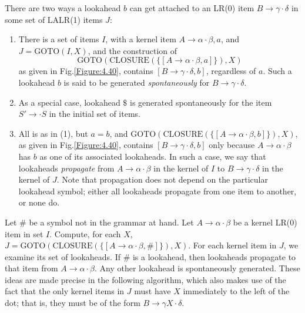 \documentclass[12pt,a4paper,twoside,openany]{book}
\begin{document}
There are two ways a lookahead $b$ can get attached to an LR(0) item $B\rightarrow\gamma\cdot\delta$ in some set of LALR(1) items $J$:
\begin{enumerate}
    \item There is a set of items $I$, with a kernel item $A\rightarrow\alpha\cdot\beta,a$, and $J=\mathrm{GOTO}(I,X)$, and the construction of $$\text{GOTO}(\text{CLOSURE}(\{[A\rightarrow\alpha\cdot\beta,a]\}),X)$$ as given in Fig.\;\ref{Figure:4.40}, contains $[B\rightarrow\gamma\cdot\delta,b]$, regardless of $a$. Such a lookahead $b$ is said to be generated \textit{spontaneously} for $B\rightarrow\gamma\cdot\delta$.
    \item As a special case, lookahead $\mathdollar$ is generated spontaneously for the item $S'\rightarrow\cdot S$ in the initial set of items.
    \item All is as in (1), but $a=b$, and $\text{GOTO}(\text{CLOSURE}(\{[A\rightarrow\alpha\cdot\beta,b]\}),X)$, as given in Fig.\;\ref{Figure:4.40}, contains $[B\rightarrow\gamma\cdot\delta,b]$ only because $A\rightarrow\alpha\cdot\beta$ has $b$ as one of its associated lookaheads. In such a case, we say that lookaheads \textit{propagate} from $A\rightarrow\alpha\cdot\beta$ in the kernel of $I$ to $B\rightarrow\gamma\cdot\delta$ in the kernel of $J$. Note that propagation does not depend on the particular lookahead symbol; either all lookaheads propagate from one item to another, or none do.
\end{enumerate}

Let \# be a symbol not in the grammar at hand. Let $A\rightarrow\alpha\cdot\beta$ be a kernel LR(0) item in set $I$. Compute, for each $X$, $J=\text{GOTO}(\text{CLOSURE}(\{[A\rightarrow\alpha\cdot\beta,\#]\}),X)$. For each kernel item in $J$, we examine its set of lookaheads. If \# is a lookahead, then lookaheads propagate to that item from $A\rightarrow\alpha\cdot\beta$. Any other lookahead is spontaneously generated. These ideas are made precise in the following algorithm, which also makes use of the fact that the only kernel items in $J$ must have $X$ immediately to the left of the dot; that is, they must be of the form $B\rightarrow\gamma X\cdot\delta$.

\end{document}
